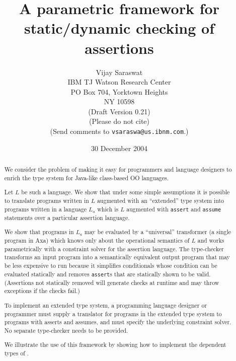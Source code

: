 \documentclass{article}
\def\java{{\sf Java}}
\begin{document}
\title{A parametric framework for static/dynamic checking of assertions}
\author{
Vijay Saraswat \\
IBM TJ Watson Research Center \\
PO Box 704, Yorktown Heights\\
NY 10598\\
({\sc Draft Version 0.21})\\
(Please do not cite)\\
(Send comments to {\tt vsaraswa@us.ibnm.com}.)
}

\date{30 December 2004}
\maketitle

\begin{abstract}
We consider the problem of making it easy for programmers and language
designers to enrich the type system for \java-like class-based OO
languages. 

Let $L$ be such a language.  We show that under some simple
assumptions it is possible to translate programs written in $L$
augmented with an ``extended'' type system into programs written in
a language $L_a$ which is 
$L$  augmented with {\tt assert} and {\tt assume} statements over a
particular assertion language.

We show that programs in $L_a$ may be evaluated by a ``universal''
transformer (a single program in {\sf Axa}) which knows only about the
operational semantics of $L$ and works parametrically with a
constraint solver for the assertion language. The type-checker
transforms an input program into a semantically equivalent output
program that may be less expensive to run because it simplifies
conditionals whose condition can be evaluated statically and removes
{\tt assert}s that are statically shown to be valid. (Assertions not
statically removed will generate checks at runtime and may throw
exceptions if the checks fail.)

To implement an extended type system, a programming language designer
or programmer must supply a translator for programs in the extended
type system to programs with asserts and assumes, and must specify the
underlying constraint solver. No separate type-checker needs to be provided.

We illustrate the use of this framework by showing how to implement the dependent
types of \cite{saraswat-dp}.

\end{abstract}
\end{document}
